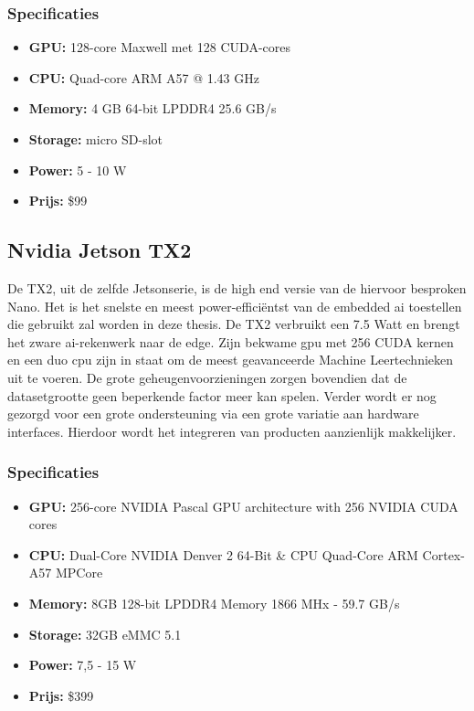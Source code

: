		\subsubsection{Specificaties}
		\begin{itemize}
			\item \textbf{GPU:} 128-core Maxwell met 128 CUDA-cores
			\item \textbf{CPU:} Quad-core ARM A57 @ 1.43 GHz
			\item \textbf{Memory:} 4 GB 64-bit LPDDR4 25.6 GB/s
			\item \textbf{Storage:}  micro SD-slot
			\item \textbf{Power:} 5 - 10 W
			\item \textbf{Prijs:} \$99
		\end{itemize}	
	

	\newpage
	
	\subsection{Nvidia Jetson TX2}
De TX2, uit de zelfde Jetsonserie, is de high end versie van de hiervoor besproken Nano\citep{bron:jetsontx2}. Het is het snelste en meest power-effici\"entst van de embedded \gls{ai} toestellen die gebruikt zal worden in deze thesis. De TX2 verbruikt een 7.5 Watt en brengt het zware \gls{ai}-rekenwerk naar de edge. Zijn bekwame \gls{gpu} met 256 CUDA kernen en een duo \gls{cpu} zijn in staat om de meest geavanceerde Machine Leertechnieken uit te voeren. De grote geheugenvoorzieningen zorgen bovendien dat de datasetgrootte geen beperkende factor meer kan spelen. Verder wordt er nog gezorgd voor een grote ondersteuning via een grote variatie aan hardware interfaces. Hierdoor wordt het integreren van producten aanzienlijk makkelijker.

\subsubsection{Specificaties}
\begin{itemize}
	\item \textbf{GPU:} 256-core NVIDIA Pascal GPU architecture with 256 NVIDIA CUDA cores
	\item \textbf{CPU:} Dual-Core NVIDIA Denver 2 64-Bit \& CPU Quad-Core ARM Cortex-A57 MPCore
	\item \textbf{Memory:} 8GB 128-bit LPDDR4 Memory 1866 MHx - 59.7 GB/s
	\item \textbf{Storage:}  32GB eMMC 5.1
	\item \textbf{Power:} 7,5 - 15 W
	\item \textbf{Prijs:} \$399
\end{itemize}	

